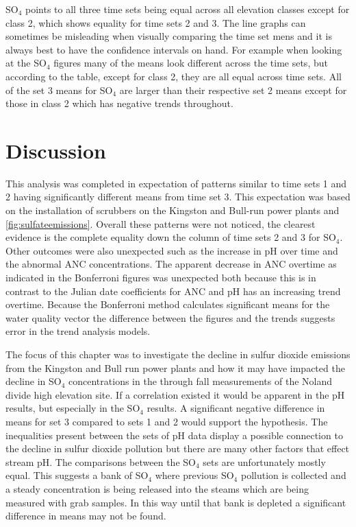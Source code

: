 SO$_4$ points to all three time sets being equal across all elevation classes except for class 2, which shows equality for time sets 2 and 3.  
The line graphs can sometimes be misleading when visually comparing the time set mens and it is always best to have the confidence intervals on hand.
For example when looking at the SO$_4$ figures many of the means look different across the time sets, but according to the table, except for class 2, they are all equal across time sets.
All of the set 3 means for SO$_4$ are larger than their respective set 2 means except for those in class 2 which has negative trends throughout.

\section{Discussion}
This analysis was completed in expectation of patterns similar to time sets 1 and 2 having significantly different means from time set 3.
This expectation was based on the installation of scrubbers on the Kingston and Bull-run power plants and \autoref{fig:sulfateemissions}.
Overall these patterns were not noticed, the clearest evidence is the complete equality down the column of time sets 2 and 3 for SO$_4$.
Other outcomes were also unexpected such as the increase in pH over time and the abnormal ANC concentrations.
The apparent decrease in ANC overtime as indicated in the Bonferroni figures was unexpected both because this is in contrast to the Julian date coefficients for ANC and pH has an increasing trend overtime.
Because the Bonferroni method calculates significant means for the water quality vector the difference between the figures and the trends suggests error in the trend analysis models.

The focus of this chapter was to investigate the decline in sulfur dioxide emissions from the Kingston and Bull run power plants and how it may have impacted the decline in SO$_4$  concentrations in the through fall measurements of the Noland divide high elevation site.
If a correlation existed it would be apparent in the pH results, but especially in the SO$_4$ results.
A significant negative difference in means for set 3 compared to sets 1 and 2 would support the hypothesis.
The inequalities present between the sets of pH data display a possible connection to the decline in sulfur dioxide pollution but there are many other factors that effect stream pH.
The comparisons between the SO$_4$ sets are unfortunately mostly equal.
This suggests a bank of SO$_4$ where previous SO$_4$ pollution is collected and a steady concentration is being released into the steams which are being measured with grab samples.
In this way until that bank is depleted a significant difference in means may not be found.

